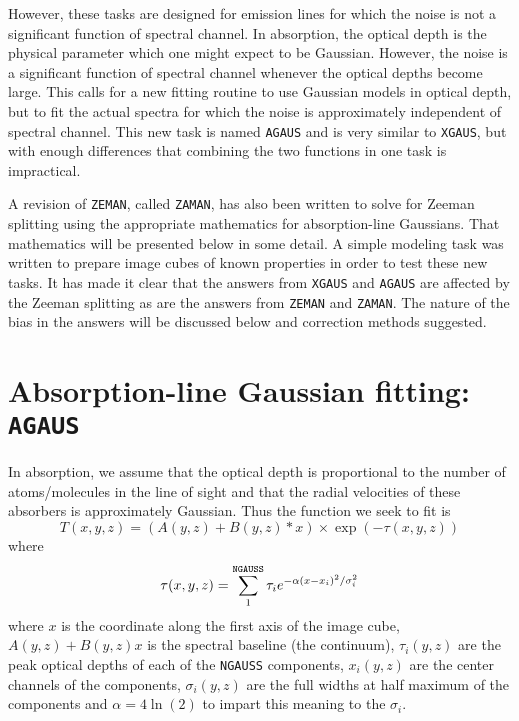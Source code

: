 \documentclass[twoside]{article}
\begin{document}
However, these tasks are designed for emission lines for which the
noise is not a significant function of spectral channel.  In
absorption, the optical depth is the physical parameter which one
might expect to be Gaussian.  However, the noise is a significant
function of spectral channel whenever the optical depths become large.
This calls for a new fitting routine to use Gaussian models in optical
depth, but to fit the actual spectra for which the noise is
approximately independent of spectral channel.  This new task is named
{\tt AGAUS} and is very similar to {\tt XGAUS}, but with enough
differences that combining the two functions in one task is
impractical.

A revision of {\tt ZEMAN}, called {\tt ZAMAN}, has also been written
to solve for Zeeman splitting using the appropriate mathematics for
absorption-line Gaussians.  That mathematics will be presented below
in some detail.  A simple modeling task was written to prepare image
cubes of known properties in order to test these new tasks.  It has
made it clear that the answers from {\tt XGAUS} and {\tt AGAUS} are
affected by the Zeeman splitting as are the answers from {\tt ZEMAN}
and {\tt ZAMAN}\@.  The nature of the bias in the answers will be
discussed below and correction methods suggested.

\section{Absorption-line Gaussian fitting: {\tt AGAUS}}

In absorption, we assume that the optical depth is proportional to the
number of atoms/molecules in the line of sight and that the radial
velocities of these absorbers is approximately Gaussian.  Thus the
function we seek to fit is
\begin{equation}
   T(x,y,z) = (A(y,z) + B(y,z) * x) \times \exp (-\tau(x,y,z))
\end{equation}
where
\begin{equation}
   \tau(x,y,z) = \sum_1^{\tt NGAUSS} \tau_i e^{-\alpha (x - x_i)^2 /
     \sigma_i^2}
\end{equation}
where $x$ is the coordinate along the first axis of the image cube,
$A(y,z) + B(y,z)x$ is the spectral baseline (the continuum),
$\tau_i(y,z)$ are the peak optical depths of each of the {\tt NGAUSS}
components, $x_i(y,z)$ are the center channels of the components,
$\sigma_i(y,z)$  are the full widths at half maximum of the components
and $\alpha = 4 \ln(2)$ to impart this meaning to the $\sigma_i$.
\end{document}
